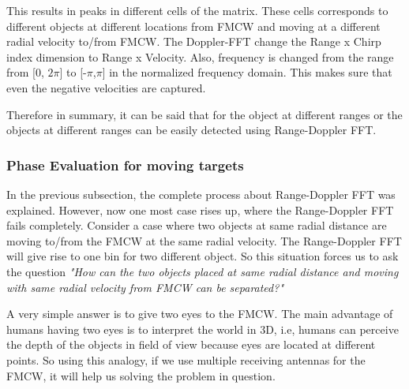 This results in peaks in different cells of the matrix. These cells corresponds to different objects at different locations from FMCW and moving at a different radial velocity to/from FMCW. The Doppler-FFT change the Range x Chirp index dimension to Range x Velocity. Also, frequency is changed from the range from [0, $2\pi$] to [-$\pi$,$\pi$] in the normalized frequency domain. This makes sure that even the negative velocities are captured.

Therefore in summary, it can be said that for the object at different ranges or the objects at different ranges can be easily detected using Range-Doppler FFT.

\subsubsection{Phase Evaluation for moving targets}

In the previous subsection, the complete process about Range-Doppler FFT was explained. However, now one most case rises up, where the Range-Doppler FFT fails completely. Consider a case where two objects at same radial distance are moving to/from the FMCW at the same radial velocity. The Range-Doppler FFT will give rise to one bin for two different object. So this situation forces us to ask the question
\textit{"How can the two objects placed at same radial distance and moving with same radial velocity from FMCW can be  separated?"}

A very simple answer is to give two eyes to the FMCW. The main advantage of humans having two eyes is to interpret the world in 3D, i.e, humans can perceive the depth of the objects in field of view because eyes are located at different points. So using this analogy, if we use multiple receiving antennas for the FMCW, it will help us solving the problem in question.

